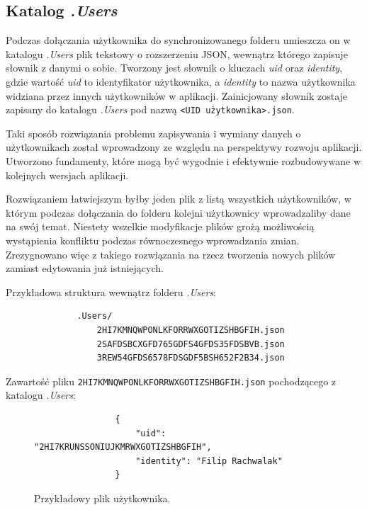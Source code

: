 \documentclass[polish,a4paper,twoside]{ppfcmthesis}
\begin{document}
\subsection{Katalog \emph{.Users}}

Podczas dołączania użytkownika do synchronizowanego folderu umieszcza on w katalogu \emph{.Users} plik tekstowy o rozszerzeniu JSON, wewnątrz którego zapisuje słownik z danymi o sobie. Tworzony jest słownik o kluczach \emph{uid} oraz \emph{identity}, gdzie wartość \emph{uid} to identyfikator użytkownika, a \emph{identity} to nazwa użytkownika widziana przez innych użytkowników w aplikacji. Zainicjowany słownik zostaje zapisany do katalogu \emph{.Users} pod nazwą \texttt{<UID użytkownika>.json}.

Taki sposób rozwiązania problemu zapisywania i wymiany danych o użytkownikach został wprowadzony ze względu na perspektywy rozwoju aplikacji. Utworzono fundamenty, które mogą być wygodnie i efektywnie rozbudowywane w kolejnych wersjach aplikacji.

Rozwiązaniem łatwiejszym byłby jeden plik z listą wszystkich użytkowników, w którym podczas dołączania do folderu kolejni użytkownicy wprowadzaliby dane na swój temat. Niestety wszelkie modyfikacje plików grożą możliwością wystąpienia konfliktu podczas równoczesnego wprowadzania zmian. Zrezygnowano więc z takiego rozwiązania na rzecz tworzenia nowych plików zamiast edytowania już istniejących.

Przykładowa struktura wewnątrz folderu \emph{.Users}:

\begin{minipage}{\linewidth}
\vspace{1em}
\begin{verbatim}
              .Users/
                  2HI7KMNQWPONLKFORRWXGOTIZSHBGFIH.json
                  2SAFDSBCXGFD765GDFS4GFDS35FDSBVB.json
                  3REW54GFDS6578FDSGDF5BSH652F2B34.json
\end{verbatim}
\vspace{1em}
\end{minipage}

Zawartość pliku \texttt{2HI7KMNQWPONLKFORRWXGOTIZSHBGFIH.json} pochodzącego z katalogu \emph{.Users}:

\begin{figure}[htb]
  \begin{verbatim}
                {
                    "uid": "2HI7KRUNSSONIUJKMRWXGOTIZSHBGFIH", 
                    "identity": "Filip Rachwalak"
                }
  \end{verbatim}
  \caption{Przykładowy plik użytkownika.}
\end{figure}
\end{document}
